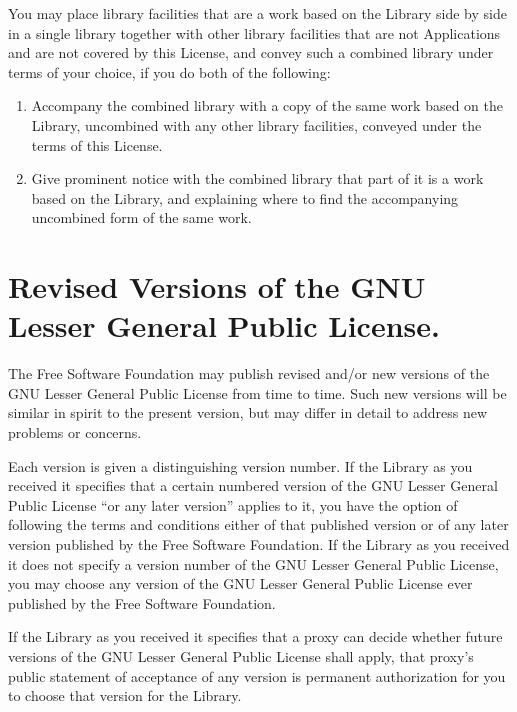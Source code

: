\documentclass[a4paper, 12pt]{article}
\begin{document}
You may place library facilities that are a work based on the Library side by side in a single library together with other library facilities that are not Applications and are not covered by this License, and convey such a combined library under terms of your choice, if you do both of the following:

\begin{enumerate}[label=\alph*)]
\item Accompany the combined library with a copy of the same work based on the Library, uncombined with any other library facilities, conveyed under the terms of this License.
\item Give prominent notice with the combined library that part of it is a work based on the Library, and explaining where to find the accompanying uncombined form of the same work.
\end{enumerate}

\section{Revised Versions of the GNU Lesser General Public License.}

The Free Software Foundation may publish revised and/or new versions of the GNU Lesser General Public License from time to time. Such new versions will be similar in spirit to the present version, but may differ in detail to address new problems or concerns.

\vspace{0.3cm}

Each version is given a distinguishing version number. If the Library as you received it specifies that a certain numbered version of the GNU Lesser General Public License ``or any later version'' applies to it, you have the option of following the terms and conditions either of that published version or of any later version published by the Free Software Foundation. If the Library as you received it does not specify a version number of the GNU Lesser General Public License, you may choose any version of the GNU Lesser General Public License ever published by the Free Software Foundation.

\vspace{0.3cm}

If the Library as you received it specifies that a proxy can decide whether future versions of the GNU Lesser General Public License shall apply, that proxy's public statement of acceptance of any version is permanent authorization for you to choose that version for the Library.
\end{document}
